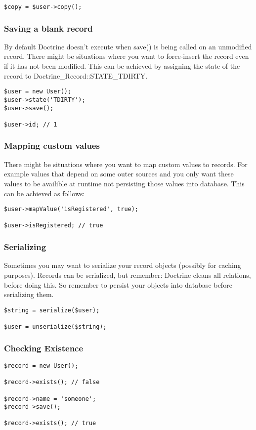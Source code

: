 \documentclass[11pt,a4paper]{report}
\begin{document}
\begin{verbatim}
$copy = $user->copy();
\end{verbatim}

\subsubsection{Saving a blank record}
By default Doctrine doesn't execute when save() is being called on an unmodified record. There might be situations where you want to force-insert the record even if it has not been modified. This can be achieved by assigning the state of the record to Doctrine\_Record::STATE\_TDIRTY.

\begin{verbatim}
$user = new User();
$user->state('TDIRTY');
$user->save();

$user->id; // 1
\end{verbatim}

\subsubsection{Mapping custom values}
There might be situations where you want to map custom values to records. For example values that depend on some outer sources and you only want these values to be availible at runtime not persisting those values into database. This can be achieved as follows:

\begin{verbatim}
$user->mapValue('isRegistered', true);

$user->isRegistered; // true
\end{verbatim}

\subsubsection{Serializing}
Sometimes you may want to serialize your record objects (possibly for caching purposes). Records can be serialized, but remember: Doctrine cleans all relations, before doing this. So remember to persist your objects into database before serializing them.

\begin{verbatim}
$string = serialize($user);

$user = unserialize($string);
\end{verbatim}

\subsubsection{Checking Existence}
\begin{verbatim}
$record = new User();

$record->exists(); // false

$record->name = 'someone';
$record->save();

$record->exists(); // true
\end{verbatim}
\end{document}
